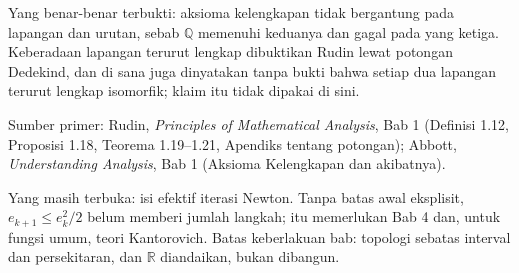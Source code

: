 \begin{untukpeneliti}
Yang benar-benar terbukti: aksioma kelengkapan tidak bergantung pada lapangan dan urutan,
sebab $\mathbb{Q}$ memenuhi keduanya dan gagal pada yang ketiga. Keberadaan lapangan
terurut lengkap dibuktikan Rudin lewat potongan Dedekind, dan di sana juga dinyatakan
tanpa bukti bahwa setiap dua lapangan terurut lengkap isomorfik; klaim itu tidak dipakai
di sini.

Sumber primer: Rudin, \emph{Principles of Mathematical Analysis}, Bab 1 (Definisi 1.12,
Proposisi 1.18, Teorema 1.19--1.21, Apendiks tentang potongan); Abbott,
\emph{Understanding Analysis}, Bab 1 (Aksioma Kelengkapan dan akibatnya).

Yang masih terbuka: isi efektif iterasi Newton. Tanpa batas awal eksplisit,
$e_{k+1}\le e_k^2/2$ belum memberi jumlah langkah; itu memerlukan Bab 4 dan, untuk
fungsi umum, teori Kantorovich. Batas keberlakuan bab: topologi sebatas interval dan
persekitaran, dan $\mathbb{R}$ diandaikan, bukan dibangun.
\end{untukpeneliti}

